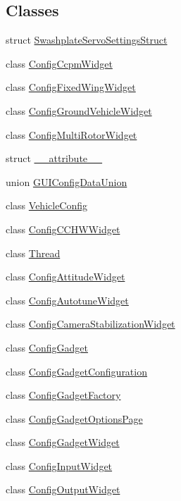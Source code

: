 \subsection*{Classes}
\begin{DoxyCompactItemize}
\item 
struct \hyperlink{struct_swashplate_servo_settings_struct}{Swashplate\-Servo\-Settings\-Struct}
\item 
class \hyperlink{class_config_ccpm_widget}{Config\-Ccpm\-Widget}
\item 
class \hyperlink{class_config_fixed_wing_widget}{Config\-Fixed\-Wing\-Widget}
\item 
class \hyperlink{class_config_ground_vehicle_widget}{Config\-Ground\-Vehicle\-Widget}
\item 
class \hyperlink{class_config_multi_rotor_widget}{Config\-Multi\-Rotor\-Widget}
\item 
struct \hyperlink{struct____attribute____}{\-\_\-\-\_\-attribute\-\_\-\-\_\-}
\item 
union \hyperlink{union_g_u_i_config_data_union}{G\-U\-I\-Config\-Data\-Union}
\item 
class \hyperlink{class_vehicle_config}{Vehicle\-Config}
\item 
class \hyperlink{class_config_c_c_h_w_widget}{Config\-C\-C\-H\-W\-Widget}
\item 
class \hyperlink{class_thread}{Thread}
\item 
class \hyperlink{class_config_attitude_widget}{Config\-Attitude\-Widget}
\item 
class \hyperlink{class_config_autotune_widget}{Config\-Autotune\-Widget}
\item 
class \hyperlink{class_config_camera_stabilization_widget}{Config\-Camera\-Stabilization\-Widget}
\item 
class \hyperlink{class_config_gadget}{Config\-Gadget}
\item 
class \hyperlink{class_config_gadget_configuration}{Config\-Gadget\-Configuration}
\item 
class \hyperlink{class_config_gadget_factory}{Config\-Gadget\-Factory}
\item 
class \hyperlink{class_config_gadget_options_page}{Config\-Gadget\-Options\-Page}
\item 
class \hyperlink{class_config_gadget_widget}{Config\-Gadget\-Widget}
\item 
class \hyperlink{class_config_input_widget}{Config\-Input\-Widget}
\item 
class \hyperlink{class_config_output_widget}{Config\-Output\-Widget}

\end{DoxyCompactItemize}
